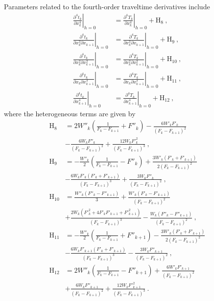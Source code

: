 Parameters related to the fourth-order traveltime derivatives include
\begin{align}
\left. \frac{\partial^4 t_k }{\partial x_k^4}\right\rvert_{h=0} & = \left. \frac{\partial^4 T_k }{\partial x_k^4}\right\rvert_{h=0} + \text{H}_8~,\\
\nonumber
\left. \frac{\partial^4 t_k }{\partial x_k^3 \partial x_{k+1}}\right\rvert_{h=0} & = \left. \frac{\partial^4 T_k }{\partial x_k^3 \partial x_{k+1}}\right\rvert_{h=0}  + \text{H}_9~,\\
\nonumber
\left. \frac{\partial^4 t_k }{\partial x_k^2 \partial x_{k+1}^2}\right\rvert_{h=0} & = \left. \frac{\partial^4 T_k }{\partial x_k^2 \partial x_{k+1}^2}\right\rvert_{h=0} + \text{H}_{10}~,\\
\nonumber
\left. \frac{\partial^4 t_k }{\partial x_k \partial x_{k+1}^3}\right\rvert_{h=0} & = \left. \frac{\partial^4 T_k }{\partial x_k \partial x_{k+1}^3}\right\rvert_{h=0} + \text{H}_{11}~,\\
\nonumber
\left. \frac{\partial^4 t_k }{\partial x_{k+1}^4}\right\rvert_{h=0} & = \left. \frac{\partial^4 T_k }{\partial x_{k+1}^4}\right\rvert_{h=0} + \text{H}_{12}~,
\end{align}
where the heterogeneous terms are given by
\begin{align}
\text{H}_8 &  =  2W''_k\left(\frac{1}{F_k-F_{k+1}} + F''_{k} \right) - \frac{6W'_k F'_k}{(F_k-F_{k+1})^2} \\
\nonumber
& - \frac{6 W_k F''_{k} }{(F_k-F_{k+1})^2} + \frac{12 W_k F'^2_{k} }{(F_k-F_{k+1})^3} ~,\\
\nonumber
\text{H}_9 &  =   -\frac{W''_k}{2} \left(\frac{1}{F_k-F_{k+1}} - F''_{k} \right) + \frac{3W'_k(F'_k+F'_{k+1})}{2(F_k-F_{k+1})^2}\\
\nonumber
&  - \frac{6 W_k F'_{k}(F'_k+F'_{k+1}) }{(F_k-F_{k+1})^3}  + \frac{3 W_k F''_{k} }{(F_k-F_{k+1})^2} ~,\\
\nonumber
\text{H}_{10} &  =  \frac{W''_k(F''_k-F''_{k+1})}{3} + \frac{W'_k(F'_k-F'_{k+1})}{(F_k-F_{k+1})^2} \\
\nonumber
& + \frac{2W_k (F'^2_k + 4F'_k F'_{k+1} + F'^2_{k+1}) }{(F_k-F_{k+1})^3} - \frac{W_k (F''_k - F''_{k+1}) }{(F_k-F_{k+1})^2}~,\\
\nonumber
\text{H}_{11} &  =  -\frac{W''_k}{2} \left(\frac{1}{F_k-F_{k+1}} + F''_{k+1} \right) - \frac{3W'_k(F'_k+F'_{k+1})}{2(F_k-F_{k+1})^2} \\
\nonumber
&  - \frac{6 W_k F'_{k+1}(F'_k+F'_{k+1}) }{(F_k-F_{k+1})^3}  - \frac{3 W_k F''_{k+1} }{(F_k-F_{k+1})^2} ~,\\
\nonumber
\text{H}_{12} &  =   2W''_k\left(\frac{1}{F_k-F_{k+1}} - F''_{k+1} \right) + \frac{6W'_k F'_{k+1}}{(F_k-F_{k+1})^2} \\
\nonumber
& + \frac{6 W_k F''_{k+1} }{(F_k-F_{k+1})^2} + \frac{12 W_k F'^2_{k+1} }{(F_k-F_{k+1})^3} ~.
\end{align}

\onecolumn


